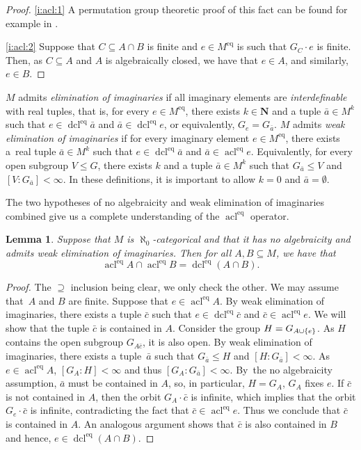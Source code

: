 \documentclass[JEP,XML,SOM,Unicode,published]{cedram}
\let\sub\subseteq
\theoremstyle{plain}
\newtheorem{lemma}[theorem]{Lemma}
\theoremstyle{definition}
\newcommand{\N}{{\mathbf N}}
\DeclareMathOperator{\acl}{acl}
\DeclareMathOperator{\dcl}{dcl}
\DeclarePairedDelimiter\set{\{}{\}}
\newcommand{\eq}{^{\mathrm{eq}}}
\begin{document}
\skpt
\begin{proof}
\eqref{i:acl:1} A permutation group theoretic proof of this fact can be found for example in \cite[Lem.\,2.4]{Evans2016}.

\eqref{i:acl:2} Suppose that $C \sub A \cap B$ is finite and $e \in M\eq$ is such that $G_C \cdot e$ is finite. Then, as $C \sub A$ and $A$ is algebraically closed, we have that $e \in A$, and similarly, $e \in B$.
\end{proof}

$M$ admits \emph{elimination of imaginaries} if all imaginary elements are \emph{interdefinable} with real tuples, that is, for every $e \in M\eq$, there exists $k \in \N$ and a tuple $\bar a \in M^k$ such that $e \in \dcl\eq \bar a$ and $\bar a \in \dcl\eq e$, or equivalently, $G_e = G_{\bar a}$. $M$ admits \emph{weak elimination of imaginaries} if for every imaginary element $e \in M\eq$, there exists a~real tuple $\bar a \in M^k$ such that $e \in \dcl\eq \bar a$ and $\bar a \in \acl\eq e$. Equivalently, for every open subgroup $V \leq G$, there exists $k$ and a tuple $\bar a \in M^k$ such that $G_{\bar a} \leq V$ and $[V : G_{\bar a}] < \infty$. In these definitions, it is important to allow $k = 0$ and $\bar a = \emptyset$.

The two hypotheses of no algebraicity and weak elimination of imaginaries combined give us a complete understanding of the $\acl\eq$ operator.
\begin{lemma}
\label{l:no-algeb-and-welim}
Suppose that $M$ is $\aleph_0$-categorical and that it has no algebraicity and admits weak elimination of imaginaries. Then for all $A, B \sub M$, we have that
\begin{equation*}
\acl\eq A \cap \acl\eq B = \dcl\eq (A \cap B).
\end{equation*}
\end{lemma}
\begin{proof}
The $\supseteq$ inclusion being clear, we only check the other. We may assume that~$A$ and $B$ are finite. Suppose that $e \in \acl\eq A$. By weak elimination of imaginaries, there exists a tuple $\bar c$ such that $e \in \dcl\eq \bar c$ and $\bar c \in \acl\eq e$. We will show that the tuple $\bar c$ is contained in $A$. Consider the group $H = G_{A \cup \set{e}}$. As $H$ contains the open subgroup $G_{A \bar c}$, it is also open. By weak elimination of imaginaries, there exists a tuple~$\bar a$ such that $G_{\bar a} \leq H$ and $[H : G_{\bar a}] < \infty$. As $e \in \acl\eq A$, $[G_A : H] < \infty$ and thus $[G_A : G_{\bar a}] < \infty$. By~the no algebraicity assumption, $\bar a$ must be contained in $A$, so, in particular, $H = G_A$, \ie $G_A$ fixes $e$. If $\bar c$ is not contained in $A$, then the orbit $G_A \cdot \bar c$ is infinite, which implies that the orbit $G_e \cdot \bar c$ is infinite, contradicting the fact that $\bar c \in \acl\eq e$. Thus we conclude that $\bar c$ is contained in $A$. An analogous argument shows that $\bar c$ is also contained in $B$ and hence, $e \in \dcl\eq (A \cap B)$.
\end{proof}
\end{document}
